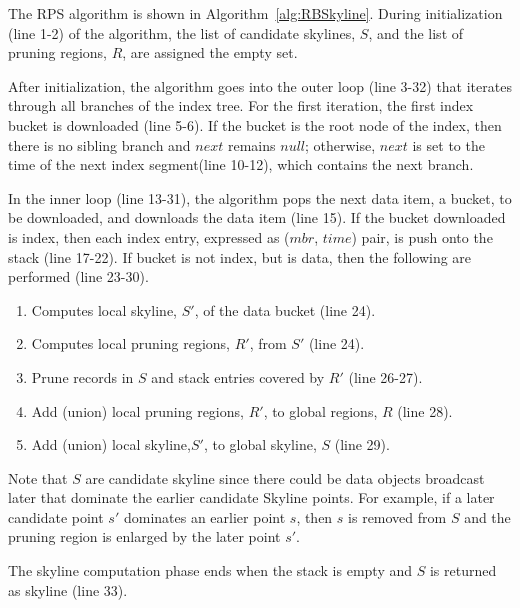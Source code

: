 The RPS algorithm is shown in Algorithm~\ref{alg:RBSkyline}. During initialization (line 1-2) of the algorithm, the list of candidate skylines, $S$, and the list of pruning regions, $R$, are assigned the empty set.

After initialization, the algorithm goes into the outer loop (line 3-32) that iterates through all branches of the index tree. For the first iteration, the first index bucket is downloaded (line 5-6). If the bucket is the root node of the index, then there is no sibling branch and $next$ remains $null$; otherwise, $next$ is set to the time of the next index segment(line 10-12), which contains the next branch.

In the inner loop (line 13-31), the algorithm pops the next data item, a bucket, to be downloaded, and downloads the data item (line 15). If the bucket downloaded is index, then each index entry, expressed as ($mbr$, $time$) pair, is push onto the stack (line 17-22). If bucket is not index, but is data, then the following are performed (line 23-30).

\begin{enumerate}
\item Computes local skyline, $S'$, of the data bucket (line 24).
\item Computes local pruning regions, $R'$, from $S'$ (line 24).
\item Prune records in $S$ and stack entries covered by $R'$ (line 26-27).
\item Add (union) local pruning regions, $R'$, to global regions, $R$ (line 28).
\item Add (union) local skyline,$S'$, to global skyline, $S$ (line 29).
\end{enumerate}

Note that $S$ are candidate skyline since there could be data objects broadcast later that dominate the earlier candidate Skyline points. For example, if a later candidate point $s'$ dominates an earlier point $s$, then $s$ is removed from $S$ and the pruning region is enlarged by the later point $s'$.

The skyline computation phase ends when the stack is empty and $S$ is returned as skyline (line 33).

